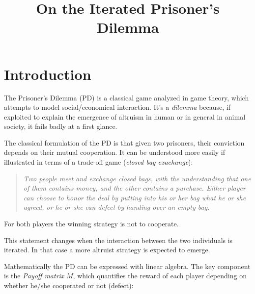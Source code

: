 \documentclass[journal,a4paper,10pt,twoside]{IEEEtran}
\begin{document}
\title{On the Iterated Prisoner's Dilemma}

\author{%

}

\maketitle

\begin{abstract}
\end{abstract}

\section{Introduction}
The Prisoner's Dilemma (PD) is a classical game analyzed in game theory, which attempts to model social/economical interaction. It's a \textit{dilemma} because, if exploited to explain the emergence of altruism in human or in general in animal society, it fails badly at a first glance.

The classical formulation of the PD is that given two prisoners, their conviction depends on their mutual cooperation. It can be understood more easily if illustrated in terms of a trade-off game (\textit{closed bag exachange}):

\begin{quote}
\textit{Two people meet and exchange closed bags, with the understanding that one of them contains money, and the other contains a purchase. Either player can choose to honor the deal by putting into his or her bag what he or she agreed, or he or she can defect by handing over an empty bag.}
\end{quote}

For both players the winning strategy is not to cooperate.

This statement changes when the interaction between the two individuals is iterated. In that case a more altruist strategy is expected to emerge.

Mathematically the PD can be expressed with linear algebra. The key component is the \textit{Payoff matrix} $M$, which quantifies the reward of each player depending on whether he/she cooperated or not (defect):
\end{document}
